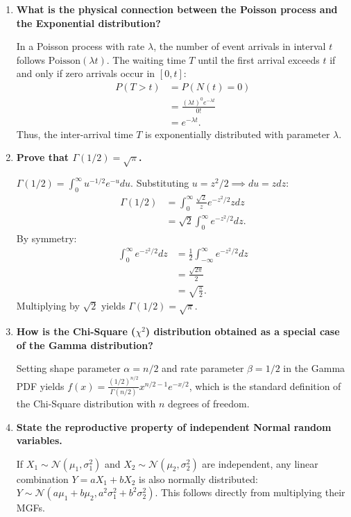 \documentclass[12pt,a4paper]{article}
\newcommand{\Q}[1]{\textbf{#1}\par\noindent\ignorespaces}
\begin{document}
\begin{tcolorbox}[exambox, title={\textbf{Frequently Asked / Viva Questions}}]
\begin{enumerate}[topsep=0pt, label=\textbf{Q\arabic*.}, itemsep=5pt]
  \item \Q{What is the physical connection between the Poisson process and the Exponential distribution?}
  In a Poisson process with rate $\lambda$, the number of event arrivals in interval $t$ follows $\text{Poisson}(\lambda t)$. The waiting time $T$ until the first arrival exceeds $t$ if and only if zero arrivals occur in $[0, t]$:
  \[
    \begin{aligned}
      P(T > t) &= P(N(t) = 0) \\[3pt]
      &= \frac{(\lambda t)^0 e^{-\lambda t}}{0!} \\[3pt]
      &= e^{-\lambda t}.
    \end{aligned}
  \]
   Thus, the inter-arrival time $T$ is exponentially distributed with parameter $\lambda$.
  \item \Q{Prove that $\Gamma(1/2) = \sqrt{\pi}$.}
  $\Gamma(1/2) = \int_0^\infty u^{-1/2} e^{-u} du$. Substituting $u = z^2/2 \implies du = z dz$:
  \[
    \begin{aligned}
      \Gamma(1/2) &= \int_0^\infty \frac{\sqrt{2}}{z} e^{-z^2/2} z dz \\[3pt]
      &= \sqrt{2} \int_0^\infty e^{-z^2/2} dz.
    \end{aligned}
  \]
   By symmetry:
  \[
    \begin{aligned}
      \int_0^\infty e^{-z^2/2} dz &= \frac{1}{2} \int_{-\infty}^\infty e^{-z^2/2} dz \\[3pt]
      &= \frac{\sqrt{2\pi}}{2} \\[3pt]
      &= \sqrt{\frac{\pi}{2}}.
    \end{aligned}
  \]
   Multiplying by $\sqrt{2}$ yields $\Gamma(1/2) = \sqrt{\pi}$.

  \item \Q{How is the Chi-Square ($\chi^2$) distribution obtained as a special case of the Gamma distribution?}
  Setting shape parameter $\alpha = n/2$ and rate parameter $\beta = 1/2$ in the Gamma PDF yields $f(x) = \frac{(1/2)^{n/2}}{\Gamma(n/2)} x^{n/2 - 1} e^{-x/2}$, which is the standard definition of the Chi-Square distribution with $n$ degrees of freedom.

  \item \Q{State the reproductive property of independent Normal random variables.}
  If $X_1 \sim \mathcal{N}(\mu_1, \sigma_1^2)$ and $X_2 \sim \mathcal{N}(\mu_2, \sigma_2^2)$ are independent, any linear combination $Y = aX_1 + bX_2$ is also normally distributed: $Y \sim \mathcal{N}(a\mu_1 + b\mu_2, a^2\sigma_1^2 + b^2\sigma_2^2)$. This follows directly from multiplying their MGFs.
\end{enumerate}
\end{tcolorbox}
\end{document}
